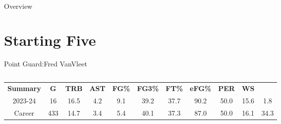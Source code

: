 



\begin{frame}{Overview}
    \tableofcontents
\end{frame}





\section{Starting Five}

\begin{frame}{Point Guard:Fred VanVleet}
    \pause
    \begin{columns}
        \begin{column}{0.4\textwidth}
            \begin{table}[h]
                \small
                \centering
                \begin{tabular}{ c|cccc|cccc|cc }
                    \textbf{Summary} & \textbf{G} &\textbf{TRB} &\textbf{AST} & \textbf{FG\%} & \textbf{FG3\%} &\textbf{FT\%} &\textbf{eFG\%} & \textbf{PER} & \textbf{WS} \\
                    2023-24 & 16 & 16.5 & 4.2 & 9.1 & 39.2 & 37.7 & 90.2 & 50.0 & 15.6 & 1.8 \\
                    \pause
                    Career & 433 & 14.7 & 3.4 & 5.4 & 40.1 & 37.3 & 87.0 & 50.0 & 16.1 & 34.3 \\
                \end{tabular}
                \label{fig:player-statistics}
            \end{table}
        \end{column}
        \begin{column}{0.3\textwidth}
            \begin{figure}[t]
                \vspace{-14em}
                \label{fig:Fred-VanVleet}
            \end{figure}
        \end{column} 
    \end{columns}
\end{frame}

